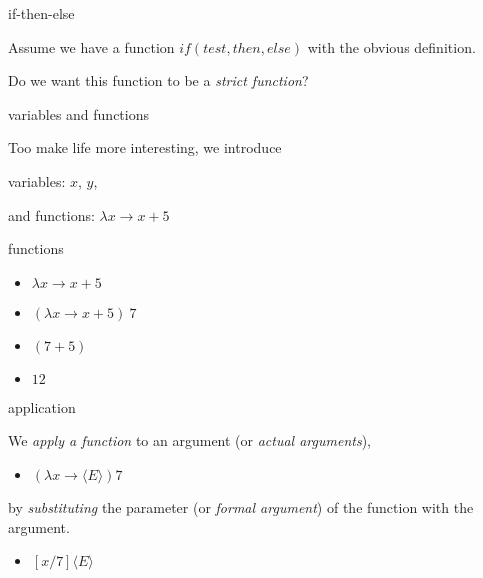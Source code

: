 \begin{frame}{if-then-else}

  Assume we have a function $if(test, then, else)$ with the obvious definition.

  \pause \vspace{20pt}

  Do we want this function to be a {\em strict function}?
  
\end{frame}


\begin{frame}{variables and functions}


Too make life more interesting, we introduce 

\vspace{10pt}\hspace{40pt}variables: $x$, $y$, 

\vspace{10pt}\hspace{40pt}and functions: $\lambda x \rightarrow x+5$

\pause

\vspace{20pt}{\em Most often written $\lambda x.x+5$ but we will use $\rightarrow$.}

\pause

\vspace{20pt}{\em So far, functions do not have names.}

\end{frame}


\begin{frame}{functions}
  \begin{itemize}
   \pause \item $\lambda x \rightarrow x + 5$
   \pause \item $(\lambda x \rightarrow x + 5) \ 7$
   \pause \item $(7 + 5)$
   \pause \item $12$
  \end{itemize}
\end{frame}

\begin{frame}{application}

We {\em apply a function} to an argument (or {\em actual arguments}),
\vspace{10pt}

  \begin{itemize}
   \pause \item $(\lambda x \rightarrow \langle E \rangle) 7$
  \end{itemize}

\pause\vspace{10pt}
by {\em substituting} the parameter (or {\em formal argument}) of the function with the argument.

\pause\vspace{10pt}
\begin{itemize}
  \item $[x/7]\langle E \rangle$
\end{itemize}
\end{frame}

